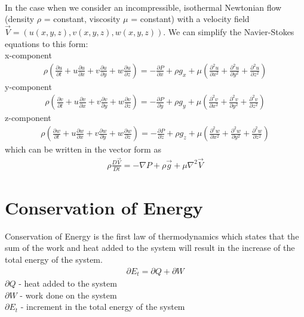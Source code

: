 \documentclass[11pt]{report}
\newcommand{\sps}{\\[0.2cm]}
\newcommand{\NI}{\noindent}
\begin{document}
	{~}\\
	\NI In the case when we consider an incompressible, isothermal Newtonian flow (density $\rho$ = constant, viscosity $\mu$ = constant) with a velocity field $\vec{V}=(u(x,y,z), v(x,y,z), w(x,y,z))$. We can simplify the Navier-Stokes equations to this form:\sps
	x-component
	\begin{eqnarray*}
		\rho\left(\frac{\partial u}{\partial t} + u\frac{\partial u}{\partial x} + v\frac{\partial u}{\partial y} + w\frac{\partial u}{\partial z}\right) = - \frac{\partial P}{\partial x} + \rho g_x + \mu\left(\frac{\partial^2 u}{\partial x^2} + \frac{\partial^2 u}{\partial y^2} + \frac{\partial^2 u}{\partial z^2}\right)
	\end{eqnarray*}
	y-component
	\begin{eqnarray*}
			\rho\left(\frac{\partial v}{\partial t} + u\frac{\partial v}{\partial x} + v\frac{\partial v}{\partial y} + w\frac{\partial v}{\partial z}\right) = - \frac{\partial P}{\partial y} + \rho g_y + \mu\left(\frac{\partial^2 v}{\partial x^2} + \frac{\partial^2 v}{\partial y^2} + \frac{\partial^2 v}{\partial z^2}\right)
	\end{eqnarray*}
	z-component
	\begin{eqnarray*}
		\rho\left(\frac{\partial w}{\partial t} + u\frac{\partial w}{\partial x} + v\frac{\partial w}{\partial y} + w\frac{\partial w}{\partial z}\right) = - \frac{\partial P}{\partial z} + \rho g_z + \mu\left(\frac{\partial^2 w}{\partial x^2} + \frac{\partial^2 w}{\partial y^2} + \frac{\partial^2 w}{\partial z^2}\right)
	\end{eqnarray*}
	which can be written in the vector form as
	\begin{eqnarray*}
		\rho \frac{D\vec{V}}{Dt} = -\nabla P + \rho\vec{g} + \mu\nabla^2\vec{V}
	\end{eqnarray*}
	
	
	
	\section{Conservation of Energy}
	Conservation of Energy is the first law of thermodynamics which states that the sum of the work and heat added to the system will result in the increase of the total energy of the system. 
	\begin{eqnarray*}
		\partial E_t = \partial Q + \partial W
	\end{eqnarray*}
	$\partial Q$ - heat added to the system\\
	$\partial W$ - work done on the system\\
	$\partial E_t$ - increment in the total energy of the system\sps
	
\end{document}
